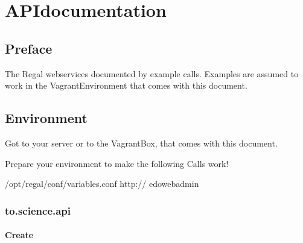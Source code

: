 \documentclass[letterpaper,10pt,english]{sphinxmanual}
\begin{document}
\chapter{API\sphinxhyphen{}documentation}
\label{\detokenize{api:api-documentation}}\label{\detokenize{api:id1}}\label{\detokenize{api::doc}}

\section{Preface}
\label{\detokenize{api:preface}}\label{\detokenize{api:id2}}
\sphinxAtStartPar
The Regal webservices documented by example \sphinxhyphen{}calls. Examples are
assumed to work in the Vagrant\sphinxhyphen{}Environment that comes with this
document.


\section{Environment}
\label{\detokenize{api:environment}}\label{\detokenize{api:id3}}
\sphinxAtStartPar
Got to your server or to the Vagrant\sphinxhyphen{}Box, that comes with this document.

\sphinxAtStartPar
{}

\sphinxAtStartPar
Prepare your environment to make the following \sphinxhyphen{}Calls work!

\begin{sphinxVerbatim}[commandchars=\\\{\}]
 /opt/regal/conf/variables.conf
 http://
 edoweb\PYGZhy{}admin
\end{sphinxVerbatim}


\subsection{to.science.api}
\label{\detokenize{api-toscience:to-science-api}}\label{\detokenize{api-toscience:id1}}\label{\detokenize{api-toscience::doc}}
\sphinxAtStartPar
{}


\subsubsection{Create}
\label{\detokenize{api-toscience:create}}\label{\detokenize{api-toscience:id2}}
\end{document}
